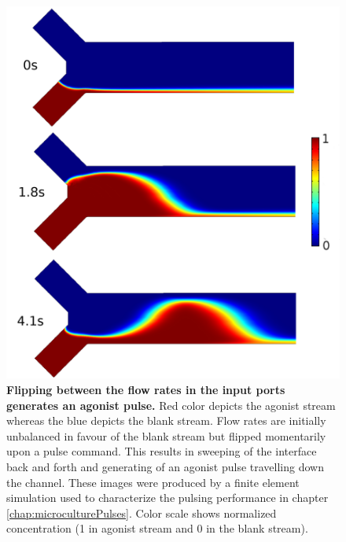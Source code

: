         \begin{figure}[!htb]
        \centering
        \includegraphics[width=12cm]{chapter1/figures/intShift/intShift.jpg}
        \caption[Generating a pulse with the interface shifting method]{\textbf{Flipping between the flow rates in the input ports generates an agonist pulse.} Red color depicts the agonist stream whereas the blue depicts the blank stream. Flow rates are initially unbalanced in favour of the blank stream but flipped momentarily upon a pulse command. This results in sweeping of the interface back and forth and generating of an agonist pulse travelling down the channel. These images were produced by a finite element simulation used to characterize the pulsing performance in chapter \ref{chap:microculturePulses}. Color scale shows normalized concentration (1 in agonist stream and 0 in the blank stream).}
        \label{fig:introduction:intShift}
    \end{figure}
    \label{sec:introduction:mufdDrugDelivery}

